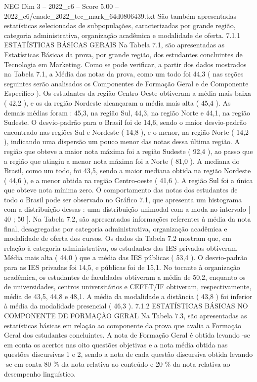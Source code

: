 \begin{textsample}{NEG Dim 3 – 2022\_c6 – Score 5.00 – 2022\_c6/enade\_2022\_tec\_mark\_64d0806439.txt}
São também apresentadas estatísticas selecionadas de subpopulações, caracterizadas por grande região, categoria administrativa, organização acadêmica e modalidade de oferta. 7.1.1 ESTATÍSTICAS BÁSICAS GERAIS Na Tabela 7.1, são apresentadas as Estatísticas Básicas da prova, por grande região, dos estudantes concluintes de Tecnologia em Marketing.
Como se pode verificar, a partir dos dados mostrados na Tabela 7.1, a Média das notas da prova, como um todo foi 44,3 ( nas seções seguintes serão analisados os Componentes de Formação Geral e de Componente Específico ).
Os estudantes da região Centro-Oeste obtiveram a média mais baixa ( 42,2 ), e os da região Nordeste alcançaram a média mais alta ( 45,4 ).
As demais médias foram : 45,3, na região Sul, 44,3, na região Norte e 44,1, na região Sudeste.
O desvio-padrão para o Brasil foi de 14,6, sendo o maior desvio-padrão encontrado nas regiões Sul e Nordeste ( 14,8 ), e o menor, na região Norte ( 14,2 ), indicando uma dispersão um pouco menor das notas dessa última região.
A região que obteve a maior nota máxima foi a região Sudeste ( 92,4 ), ao passo que a região que atingiu a menor nota máxima foi a Norte ( 81,0 ).
A mediana do Brasil, como um todo, foi 43,5, sendo a maior mediana obtida na região Nordeste ( 44,6 ), e a menor obtida na região Centro-oeste ( 41,6 ).
A região Sul foi a única que obteve nota mínima zero.
O comportamento das notas dos estudantes de todo o Brasil pode ser observado no Gráfico 7.1, que apresenta um histograma com a distribuição dessas : uma distribuição unimodal com a moda no intervalo [ 40 ; 50 ].
Na Tabela 7.2, são apresentadas informações referentes à média da nota final, desagregadas por categoria administrativa, organização acadêmica e modalidade de oferta dos cursos.
Os dados da Tabela 7.2 mostram que, em relação à categoria administrativa, os estudantes das IES privadas obtiveram Média mais alta ( 44,0 ) que a média das IES públicas ( 53,4 ).
O desvio-padrão para as IES privadas foi 14,5, e públicas foi de 15,1.
No tocante à organização acadêmica, os estudantes de faculdades obtiveram a média de 50,2, enquanto os de universidades, centros universitários e CEFET/IF obtiveram, respectivamente, média de 43,5, 44,8 e 48,1.
A média da modalidade a distância ( 43,8 ) foi inferior à média da modalidade presencial ( 46,3 ). 7.1.2 ESTATÍSTICAS BÁSICAS NO COMPONENTE DE FORMAÇÃO GERAL Na Tabela 7.3, são apresentadas as estatísticas básicas em relação ao componente da prova que avalia a Formação Geral dos estudantes concluintes.
A nota de Formação Geral é obtida levando -se em conta os acertos nas oito questões objetivas e a nota média obtida nas questões discursivas 1 e 2, sendo a nota de cada questão discursiva obtida levando -se em conta 80 \% da nota relativa ao conteúdo e 20 \% da nota relativa ao desempenho linguístico.

\end{textsample}
